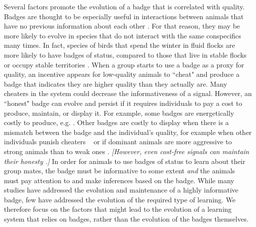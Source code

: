 Several factors promote the evolution of a badge that is correlated with quality. Badges are thought to be especially useful in interactions between animals that have no previous information about each other \cite{Remy:2010fk,Lemel:1993ve,Solberg:1997uq}. For that reason, they may be more likely to evolve in species that do not interact with the same conspecifics many times. In fact, species of birds that spend the winter in fluid flocks are more likely to have badges of status, compared to those that live in stable flocks or occupy stable territories \cite{Rohwer:1975fk,Tibbetts:2009kx}. When a group starts to use a badge as a proxy for quality, an incentive appears for low-quality animals to ``cheat" and produce a badge that indicates they are higher quality than they actually are. Many cheaters in the system could decrease the informativeness of a signal. However, an ``honest" badge can evolve and persist if it requires individuals to pay a cost to produce, maintain, or display it. For example, some badges are energetically costly to produce, e.g. \cite{Veiga:1995ys,Buchanan:2001zr,West:2002ly}. Other badges are costly to display when there is a mismatch between the badge and the individual's quality, for example when other individuals punish cheaters ~\cite{Smith2003AnimalSignals,Tibbetts:2004kx,Molles:2001kx} or if dominant animals are more aggressive to strong animals than to weak ones \cite{Rohwer:1981vn,Thompson:2014fk}.  
\textit{[However, even cost-free signals can maintain their honesty \cite{Dawkins:1991ly,Lachmann:2001uq}.]} 
In order for animals to use badges of status to learn about their group mates, the badge must be informative to some extent \emph{and} the animals must pay attention to and make inferences based on the badge. While many studies have addressed the evolution and maintenance of a highly informative badge, few have addressed the evolution of the required type of learning.  We therefore focus on the factors that might lead to the evolution of a learning system that relies on badges, rather than the evolution of the badges themselves.


